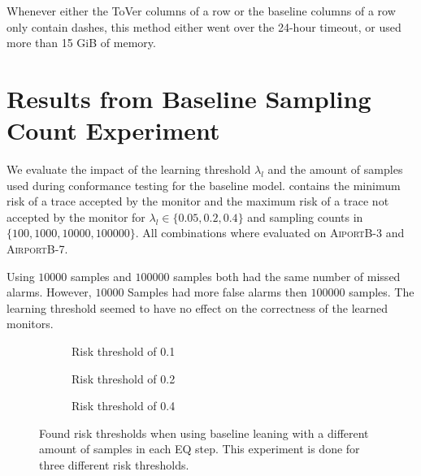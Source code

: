 \documentclass[runningheads]{llncs}
\newcommand{\alg}{ToVer\xspace}
\begin{document}
Whenever either the \alg columns of a row or the baseline columns of a row only contain dashes, this method either went over the 24-hour timeout, or used more than 15 GiB of memory.

\begin{scriptsize}
    
\end{scriptsize}

\section{Results from Baseline Sampling Count Experiment}\label{sec:ressampling}
We evaluate the impact of the learning threshold $\lambda_l$ and the amount of samples used during conformance testing for the baseline model.  contains the minimum risk of a trace accepted by the monitor and the maximum risk of a trace not accepted by the monitor for
$\lambda_l \in \{0.05, 0.2, 0.4\}$ and sampling counts in $\{100,1000,10000,100000\}$. All combinations where evaluated on \textsc{AiportB-3} and \textsc{AirportB-7}.

Using $10000$ samples and $100000$ samples both had the same number of missed alarms. However, $10000$ Samples had more false alarms then $100000$ samples. The learning threshold seemed to have no effect on the correctness of the learned monitors.
\begin{figure}[h]
    \begin{subfigure}{.5\linewidth}
        \resizebox{\linewidth}{!}{
            
        }
        \caption{Risk threshold of 0.1}
    \end{subfigure}
    \begin{subfigure}{.5\linewidth}
        \resizebox{\linewidth}{!}{
            
        }
        \caption{Risk threshold of 0.2}
    \end{subfigure}
    \begin{subfigure}{.5\linewidth}
        \resizebox{\linewidth}{!}{
            
        }
        \caption{Risk threshold of 0.4}
    \end{subfigure}
    \caption{Found risk thresholds when using baseline leaning with a different amount of samples in each EQ step. This experiment is done for three different risk thresholds.}
    \label{fig:samplingn}
\end{figure}
\end{document}
